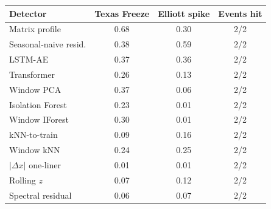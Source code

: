 \begin{tabular}{lccc}
\toprule
Detector & Texas Freeze & Elliott spike & Events hit \\
\midrule
Matrix profile & 0.68 & 0.30 & 2/2 \\
Seasonal-naive resid. & 0.38 & 0.59 & 2/2 \\
LSTM-AE & 0.37 & 0.36 & 2/2 \\
Transformer & 0.26 & 0.13 & 2/2 \\
Window PCA & 0.37 & 0.06 & 2/2 \\
Isolation Forest & 0.23 & 0.01 & 2/2 \\
Window IForest & 0.30 & 0.01 & 2/2 \\
kNN-to-train & 0.09 & 0.16 & 2/2 \\
Window kNN & 0.24 & 0.25 & 2/2 \\
$|\Delta x|$ one-liner & 0.01 & 0.01 & 2/2 \\
Rolling $z$ & 0.07 & 0.12 & 2/2 \\
Spectral residual & 0.06 & 0.07 & 2/2 \\
\bottomrule
\end{tabular}
